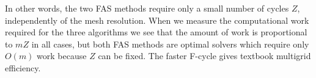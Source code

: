 \documentclass[letterpaper,final,12pt,reqno]{amsart}
\begin{document}
In other words, the two FAS methods require only a small number of cycles $Z$, independently of the mesh resolution.  When we measure the computational work required for the three algorithms we see that the amount of work is proportional to $mZ$ in all cases, but both FAS methods are optimal solvers which require only $O(m)$ work because $Z$ can be fixed.  The faster F-cycle gives textbook multigrid efficiency.


\small

\bigskip


\end{document}
